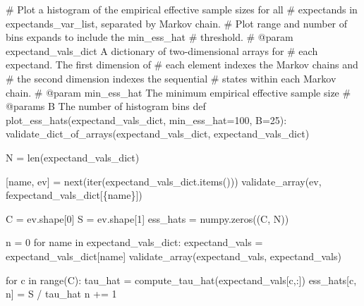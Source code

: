 \documentclass[
  letterpaper,
  DIV=11,
  numbers=noendperiod]{scrartcl}
\newenvironment{Shaded}{\begin{snugshade}}{\end{snugshade}}
\newcommand{\BuiltInTok}[1]{\textcolor[rgb]{0.00,0.23,0.31}{#1}}
\newcommand{\CommentTok}[1]{\textcolor[rgb]{0.37,0.37,0.37}{#1}}
\newcommand{\ControlFlowTok}[1]{\textcolor[rgb]{0.00,0.23,0.31}{#1}}
\newcommand{\DecValTok}[1]{\textcolor[rgb]{0.68,0.00,0.00}{#1}}
\newcommand{\KeywordTok}[1]{\textcolor[rgb]{0.00,0.23,0.31}{#1}}
\newcommand{\NormalTok}[1]{\textcolor[rgb]{0.00,0.23,0.31}{#1}}
\newcommand{\OperatorTok}[1]{\textcolor[rgb]{0.37,0.37,0.37}{#1}}
\newcommand{\SpecialCharTok}[1]{\textcolor[rgb]{0.37,0.37,0.37}{#1}}
\newcommand{\SpecialStringTok}[1]{\textcolor[rgb]{0.13,0.47,0.30}{#1}}
\newcommand{\StringTok}[1]{\textcolor[rgb]{0.13,0.47,0.30}{#1}}
\begin{document}
\begin{Shaded}
\begin{Highlighting}[]
\CommentTok{\# Plot a histogram of the empirical effective sample sizes for all}
\CommentTok{\# expectands in expectands\_var\_list, separated by Markov chain.}
\CommentTok{\# Plot range and number of bins expands to include the min\_ess\_hat}
\CommentTok{\# threshold.}
\CommentTok{\# @param expectand\_vals\_dict A dictionary of two{-}dimensional arrays for}
\CommentTok{\#                            each expectand.  The first dimension of}
\CommentTok{\#                            each element indexes the Markov chains and}
\CommentTok{\#                            the second dimension indexes the sequential}
\CommentTok{\#                            states within each Markov chain.}
\CommentTok{\# @param min\_ess\_hat The minimum empirical effective sample size}
\CommentTok{\# @params B The number of histogram bins}
\KeywordTok{def}\NormalTok{ plot\_ess\_hats(expectand\_vals\_dict,}
\NormalTok{                  min\_ess\_hat}\OperatorTok{=}\DecValTok{100}\NormalTok{, B}\OperatorTok{=}\DecValTok{25}\NormalTok{):}
\NormalTok{  validate\_dict\_of\_arrays(expectand\_vals\_dict,}
                          \StringTok{\textquotesingle{}expectand\_vals\_dict\textquotesingle{}}\NormalTok{)}

\NormalTok{  N }\OperatorTok{=} \BuiltInTok{len}\NormalTok{(expectand\_vals\_dict)}

\NormalTok{  [name, ev] }\OperatorTok{=} \BuiltInTok{next}\NormalTok{(}\BuiltInTok{iter}\NormalTok{(expectand\_vals\_dict.items()))}
\NormalTok{  validate\_array(ev, }\SpecialStringTok{f\textquotesingle{}expectand\_vals\_dict[}\SpecialCharTok{\{}\NormalTok{name}\SpecialCharTok{\}}\SpecialStringTok{]\textquotesingle{}}\NormalTok{)}

\NormalTok{  C }\OperatorTok{=}\NormalTok{ ev.shape[}\DecValTok{0}\NormalTok{]}
\NormalTok{  S }\OperatorTok{=}\NormalTok{ ev.shape[}\DecValTok{1}\NormalTok{]}
\NormalTok{  ess\_hats }\OperatorTok{=}\NormalTok{ numpy.zeros((C, N))}

\NormalTok{  n }\OperatorTok{=} \DecValTok{0}
  \ControlFlowTok{for}\NormalTok{ name }\KeywordTok{in}\NormalTok{ expectand\_vals\_dict:}
\NormalTok{    expectand\_vals }\OperatorTok{=}\NormalTok{ expectand\_vals\_dict[name]}
\NormalTok{    validate\_array(expectand\_vals, }\StringTok{\textquotesingle{}expectand\_vals\textquotesingle{}}\NormalTok{)}

    \ControlFlowTok{for}\NormalTok{ c }\KeywordTok{in} \BuiltInTok{range}\NormalTok{(C):}
\NormalTok{      tau\_hat }\OperatorTok{=}\NormalTok{ compute\_tau\_hat(expectand\_vals[c,:])}
\NormalTok{      ess\_hats[c, n] }\OperatorTok{=}\NormalTok{ S }\OperatorTok{/}\NormalTok{ tau\_hat}
\NormalTok{    n }\OperatorTok{+=} \DecValTok{1}


\end{Highlighting}
\end{Shaded}
\end{document}
